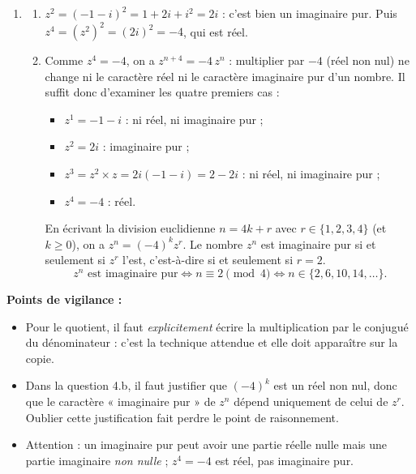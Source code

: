 \documentclass[11pt]{article}
\begin{document}
\begin{corrige}
\begin{enumerate}
\textbf{Deuxième méthode} (module d'un quotient) : $|z| = \dfrac{|2-4i|}{|1+3i|} = \dfrac{\sqrt{4+16}}{\sqrt{1+9}} = \dfrac{\sqrt{20}}{\sqrt{10}} = \sqrt{2}$.
\item 
\begin{enumerate}
\item $z^2 = (-1-i)^2 = 1 + 2i + i^2 = 2i$ : c'est bien un imaginaire pur. Puis $z^4 = (z^2)^2 = (2i)^2 = -4$, qui est réel.
\item Comme $z^4 = -4$, on a $z^{n+4} = -4\,z^n$ : multiplier par $-4$ (réel non nul) ne change ni le caractère réel ni le caractère imaginaire pur d'un nombre. Il suffit donc d'examiner les quatre premiers cas :
\begin{itemize}
\item $z^1 = -1-i$ : ni réel, ni imaginaire pur ;
\item $z^2 = 2i$ : imaginaire pur ;
\item $z^3 = z^2 \times z = 2i(-1-i) = 2 - 2i$ : ni réel, ni imaginaire pur ;
\item $z^4 = -4$ : réel.
\end{itemize}
En écrivant la division euclidienne $n = 4k + r$ avec $r \in \{1, 2, 3, 4\}$ (et $k \geq 0$), on a $z^n = (-4)^k z^r$. Le nombre $z^n$ est imaginaire pur si et seulement si $z^r$ l'est, c'est-à-dire si et seulement si $r = 2$.
\[ z^n \text{ est imaginaire pur} \iff n \equiv 2 \pmod{4} \iff n \in \{2, 6, 10, 14, \ldots\}. \]
\end{enumerate}
\end{enumerate}

\textbf{Points de vigilance :}
\begin{itemize}
\item Pour le quotient, il faut \emph{explicitement} écrire la multiplication par le conjugué du dénominateur : c'est la technique attendue et elle doit apparaître sur la copie.
\item Dans la question 4.b, il faut justifier que $(-4)^k$ est un réel non nul, donc que le caractère « imaginaire pur » de $z^n$ dépend uniquement de celui de $z^r$. Oublier cette justification fait perdre le point de raisonnement.
\item Attention : un imaginaire pur peut avoir une partie réelle nulle mais une partie imaginaire \emph{non nulle} ; $z^4 = -4$ est réel, pas imaginaire pur.
\end{itemize}
\end{corrige}
\end{document}

